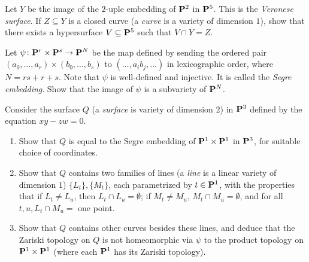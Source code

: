 \documentclass[10pt]{amsart}
\begin{document}
\begin{exercise}[2.13]
    Let $Y$ be the image of the $2$-uple embedding of ${\bf P}^2$ in ${\bf P}^5$. This is the
    \emph{Veronese surface}. If $Z \subseteq Y$ is a closed curve (a \emph{curve} is 
    a variety of dimension $1$), show that there exists a hypersurface $V \subseteq
    {\bf P}^5$ such that $V \cap Y = Z$. 
\end{exercise}

\begin{solution}
    
\end{solution}

\begin{exercise}[2.14]
    Let $\psi\colon {\bf P}^r \times {\bf P}^s \to {\bf P}^N$ be the map defined by sending
    the ordered pair $(a_0, \ldots, a_r) \times (b_0, \ldots, b_s)$ to $(\ldots,
    a_ib_j, \ldots)$ in lexicographic order, where $N = rs + r +s$. Note that
    $\psi$ is well-defined and injective. It is called the \emph{Segre embedding}.
    Show that the image of $\psi$ is a subvariety of ${\bf P}^N$.
\end{exercise}

\begin{solution}
    
\end{solution}

\begin{exercise}[2.15]
    Consider the surface $Q$ (a \emph{surface} is variety of dimension $2$) in
    ${\bf P}^3$ defined by the equation $xy-zw = 0$.
    \begin{enumerate} 
      \item Show that $Q$ is equal to the Segre embedding of ${\bf P}^1 \times {\bf P}^1$ in
        ${\bf P}^3$, for suitable choice of coordinates.
      \item Show that $Q$ contains two families of lines (a \emph{line} is a
        linear variety of dimension $1$) $\{L_t\}, \{M_t\}$, each parametrized by
        $t \in {\bf P}^1$, with the properties that if $L_t \ne L_u$, then
        $L_t \cap L_u = \emptyset$; if $M_t \ne M_u$, $M_t \cap M_u = \emptyset$,
        and for all $t,u, L_t \cap M_u =$ one point. 
      \item Show that $Q$ contains other curves besides these lines, and deduce that
        the Zariski topology on $Q$ is not homeomorphic via $\psi$ to the product
        topology on ${\bf P}^1 \times {\bf P}^1$ (where each ${\bf P}^1$ has its Zariski
        topology). 
    \end{enumerate}
\end{exercise}
\end{document}
